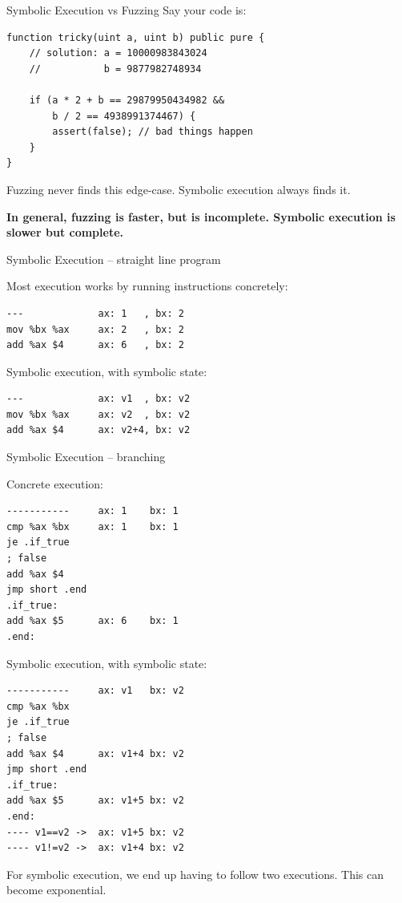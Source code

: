 \documentclass[aspectratio=169]{beamer}
\begin{document}
\begin{frame}[fragile=singleslide]{Symbolic Execution vs Fuzzing}
Say your code is:

\begin{Verbatim}[frame=single, framerule=0.2mm, framesep=2mm,fontsize=\small]
function tricky(uint a, uint b) public pure {
	// solution: a = 10000983843024
	//           b = 9877982748934
	
	if (a * 2 + b == 29879950434982 &&
	    b / 2 == 4938991374467) {
		assert(false); // bad things happen
	}
}
\end{Verbatim}

Fuzzing never finds this edge-case. Symbolic execution always finds it.
\bigskip 

\textbf{In general, fuzzing is faster, but is incomplete. Symbolic execution is slower but complete.}

\end{frame}



\begin{frame}[fragile=singleslide]{Symbolic Execution -- straight line program}

Most execution works by running instructions concretely:
\begin{verbatim}
---             ax: 1   , bx: 2
mov %bx %ax     ax: 2   , bx: 2
add %ax $4      ax: 6   , bx: 2
\end{verbatim}
\bigskip

Symbolic execution, with symbolic state:
\begin{verbatim}
---             ax: v1  , bx: v2
mov %bx %ax     ax: v2  , bx: v2
add %ax $4      ax: v2+4, bx: v2
\end{verbatim}
\end{frame}

\begin{frame}[fragile=singleslide]{Symbolic Execution -- branching}
\begin{minipage}[t]{0.45\textwidth}
Concrete execution:
\begin{Verbatim}[fontsize=\small]
-----------     ax: 1    bx: 1
cmp %ax %bx     ax: 1    bx: 1
je .if_true     
; false
add %ax $4
jmp short .end
.if_true:
add %ax $5      ax: 6    bx: 1
.end:
\end{Verbatim}
\end{minipage}%
\begin{minipage}[t]{0.45\textwidth}
Symbolic execution, with symbolic state:
\begin{Verbatim}[fontsize=\small]
-----------     ax: v1   bx: v2
cmp %ax %bx     
je .if_true     
; false
add %ax $4      ax: v1+4 bx: v2
jmp short .end
.if_true:
add %ax $5      ax: v1+5 bx: v2
.end:
---- v1==v2 ->  ax: v1+5 bx: v2
---- v1!=v2 ->  ax: v1+4 bx: v2
\end{Verbatim}
\end{minipage}
\bigskip

For symbolic execution, we end up having to follow two executions. This can become exponential.
\end{frame}
\end{document}
